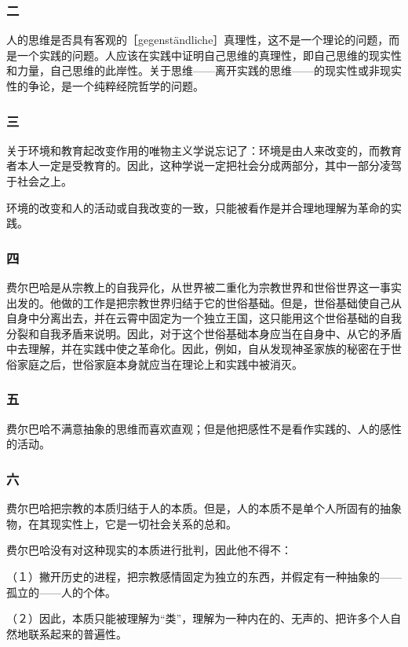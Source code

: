 \documentclass[UTF8,zihao=-4,a4paper]{ctexart}
\begin{document}
\subsubsection*{二}
人的思维是否具有客观的［gegenständliche］真理性，这不是一个理论的问题，而是一个实践的问题。人应该在实践中证明自己思维的真理性，即自己思维的现实性和力量，自己思维的此岸性。关于思维——离开实践的思维——的现实性或非现实性的争论，是一个纯粹经院哲学的问题。\par
\subsubsection*{三}
关于环境和教育起改变作用的唯物主义学说忘记了：环境是由人来改变的，而教育者本人一定是受教育的。因此，这种学说一定把社会分成两部分，其中一部分凌驾于社会之上。\par
环境的改变和人的活动或自我改变的一致，只能被看作是并合理地理解为革命的实践。\par
\subsubsection*{四}
费尔巴哈是从宗教上的自我异化，从世界被二重化为宗教世界和世俗世界这一事实出发的。他做的工作是把宗教世界归结于它的世俗基础。但是，世俗基础使自己从自身中分离出去，并在云霄中固定为一个独立王国，这只能用这个世俗基础的自我分裂和自我矛盾来说明。因此，对于这个世俗基础本身应当在自身中、从它的矛盾中去理解，并在实践中使之革命化。因此，例如，自从发现神圣家族的秘密在于世俗家庭之后，世俗家庭本身就应当在理论上和实践中被消灭。\par
\subsubsection*{五}
费尔巴哈不满意抽象的思维而喜欢直观；但是他把感性不是看作实践的、人的感性的活动。\par
\subsubsection*{六}
费尔巴哈把宗教的本质归结于人的本质。但是，人的本质不是单个人所固有的抽象物，在其现实性上，它是一切社会关系的总和。\par
费尔巴哈没有对这种现实的本质进行批判，因此他不得不：\par
（１）撇开历史的进程，把宗教感情固定为独立的东西，并假定有一种抽象的——孤立的——人的个体。\par
（２）因此，本质只能被理解为“类”，理解为一种内在的、无声的、把许多个人自然地联系起来的普遍性。\par
\end{document}
